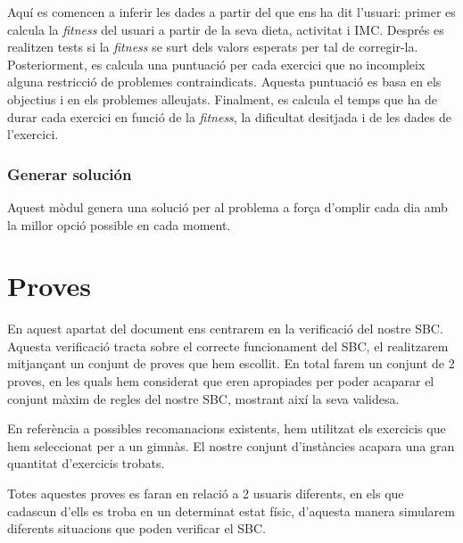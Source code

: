 \documentclass[a4paper, 12pt, UTF8]{article}
\begin{document}
Aquí es comencen a inferir les dades a partir del que ens ha dit l'usuari: primer es calcula la \textit{fitness} del usuari a partir de la seva dieta, activitat i IMC. Després es realitzen tests si la \textit{fitness} se surt dels valors esperats per tal de corregir-la.
Posteriorment, es calcula una puntuació per cada exercici que no incompleix alguna restricció de problemes contraindicats. Aquesta puntuació es basa en els objectius i en els problemes alleujats. Finalment, es calcula el temps que ha de durar cada exercici en funció de la \textit{fitness}, la dificultat desitjada i de les dades de l'exercici.

\subsubsection{Generar solución}
Aquest mòdul genera una solució per al problema a força d'omplir cada dia amb la millor opció possible en cada moment.


\section{Proves}

En aquest apartat del document ens centrarem en la verificació del nostre SBC. Aquesta verificació tracta sobre el correcte funcionament del SBC, el realitzarem mitjançant un conjunt de proves que hem escollit. En total farem un conjunt de 2 proves, en les quals hem considerat que eren apropiades per poder acaparar el conjunt màxim de regles del nostre SBC, mostrant així la seva validesa.

En referència a possibles recomanacions existents, hem utilitzat els exercicis que hem seleccionat per a un gimnàs. El nostre conjunt d'instàncies acapara una gran quantitat d'exercicis trobats. 

Totes aquestes proves es faran en relació a 2 usuaris diferents, en els que cadascun d'ells es troba en un determinat estat físic, d'aquesta manera simularem diferents situacions que poden verificar el SBC.
\end{document}
